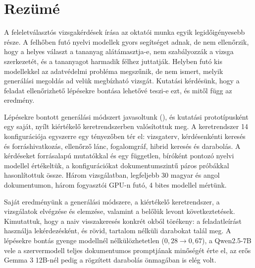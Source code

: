 

\chapter{Rezümé}
\label{app-rezume}


\medskip
A feleletválasztós vizsgakérdések írása az oktatói munka egyik legidőigényesebb része. A felhőben futó nyelvi
modellek gyors segítséget adnak, de nem ellenőrzik, hogy a helyes választ a tananyag alátámasztja-e, nem
szabályozzák a vizsga szerkezetét, és a tananyagot harmadik félhez juttatják. Helyben futó kis modellekkel az
adatvédelmi probléma megszűnik, de nem ismert, melyik generálási megoldás ad velük megbízható vizsgát.
Kutatási kérdésünk, hogy a feladat ellenőrizhető lépésekre bontása lehetővé teszi-e ezt, és mitől függ az
eredmény.

Lépésekre bontott generálási módszert javasoltunk (\Mimir{}), és kutatási prototípusként egy saját, nyílt
kiértékelő keretrendszerben valósítottuk meg. A keretrendszer 14 konfigurációja egyszerre egy tényezőben tér
el: vizsgaterv, kérdésenkénti keresés és forráshivatkozás, ellenőrző lánc, fogalomgráf, hibrid keresés és
darabolás. A kérdéseket forrásalapú mutatókkal és egy független, bíróként pontozó nyelvi modellel értékeltük,
a konfigurációkat dokumentumszintű páros próbákkal hasonlítottuk össze. Három vizsgálatban, legfeljebb 30
magyar és angol dokumentumon, három fogyasztói GPU-n futó, 4 bites modellel mértünk.

Saját eredményünk a \Mimir{} generálási módszere, a kiértékelő keretrendszer, a vizsgálatok elvégzése és
elemzése, valamint a belőlük levont következtetések. Kimutattuk, hogy a naiv visszakeresés konkrét okból
törékeny: a feladatleírást használja lekérdezésként, és rövid, tartalom nélküli darabokat talál meg. A
lépésekre bontás gyenge modellnél nélkülözhetetlen ($0{,}28\to0{,}67$), a Qwen2.5-7B vele a szervermodell
teljes dokumentumos promptjának minőségét érte el, az erős Gemma 3 12B-nél pedig a rögzített darabolás
önmagában is elég volt. 

